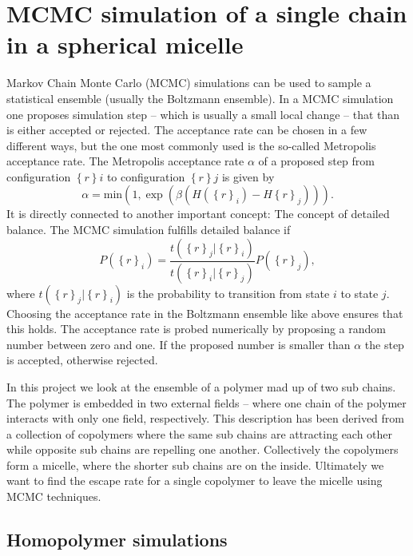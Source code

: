 \documentclass[../main.tex]{subfiles}
\begin{document}
\section{MCMC simulation of a single chain in a spherical micelle}

Markov Chain Monte Carlo (MCMC) simulations can be used to sample a statistical ensemble (usually the Boltzmann ensemble).
In a MCMC simulation one proposes simulation step -- which is usually a small local change -- that than is either accepted or rejected.
The acceptance rate can be chosen in a few different ways, but the one most commonly used is the so-called Metropolis acceptance rate.
The Metropolis acceptance rate $\alpha$ of a proposed step from configuration $\left\{ r \right\} i$ to configuration $\left\{ r \right\} j$ is given by 
\[
    \alpha = \text{min}\left( 1, \exp( \beta (H(\left\{ r \right\}_i) - H\left\{ r \right\} _j) )\right)
.\] 
It is directly connected to another important concept: The concept of detailed balance.
The MCMC simulation fulfills detailed balance if 
\[
    P(\left\{ r \right\}_i) = 
    \frac{
        t(\left\{ r \right\}_j | \left\{ r \right\}_i)
    }{
        t(\left\{ r \right\}_i | \left\{ r \right\}_j)
    }
    P(\left\{ r \right\}_j)
,\] 
where $t(\left\{ r \right\}_j | \left\{ r \right\}_i)$ is the probability to transition from state $i$ to state $j$.
Choosing the acceptance rate in the Boltzmann ensemble like above ensures that this holds.
The acceptance rate is probed numerically by proposing a random number between zero and one.
If the proposed number is smaller than $\alpha$ the step is accepted, otherwise rejected.
\par

In this project we look at the ensemble of a polymer mad up of two sub chains. 
The polymer is embedded in two external fields -- where one chain of the polymer interacts with only one field, respectively.
This description has been derived from a collection of copolymers where the same sub chains are attracting each other while opposite sub chains are repelling one another.
Collectively the copolymers form a micelle, where the shorter sub chains are on the inside.
Ultimately we want to find the escape rate for a single copolymer to leave the micelle using MCMC techniques.


\subsection{Homopolymer simulations}
\end{document}
